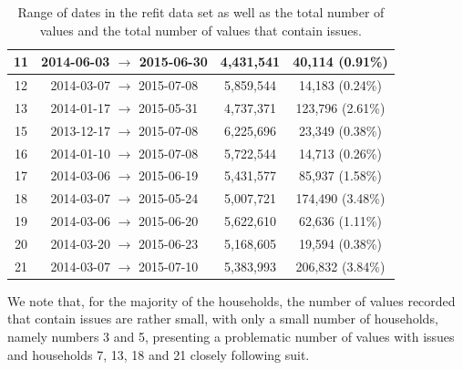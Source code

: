 \begin{table}[H]
\begin{adjustwidth}{-3.0cm}{-3.0cm}
\begin{tabular}{cccc}
                        11                        & 2014-06-03 $\rightarrow$ 2015-06-30 & 4,431,541                       & 40,114 (0.91\%)                    \\ \midrule
                        12                        & 2014-03-07 $\rightarrow$ 2015-07-08 & 5,859,544                       & 14,183 (0.24\%)                    \\ \midrule
                        13                        & 2014-01-17 $\rightarrow$ 2015-05-31 & 4,737,371                       & 123,796 (2.61\%)                   \\ \midrule
                        15                        & 2013-12-17 $\rightarrow$ 2015-07-08 & 6,225,696                       & 23,349 (0.38\%)                    \\ \midrule
                        16                        & 2014-01-10 $\rightarrow$ 2015-07-08 & 5,722,544                       & 14,713 (0.26\%)                    \\ \midrule
                        17                        & 2014-03-06 $\rightarrow$ 2015-06-19 & 5,431,577                       & 85,937 (1.58\%)                    \\ \midrule
                        18                        & 2014-03-07 $\rightarrow$ 2015-05-24 & 5,007,721                       & 174,490 (3.48\%)                   \\ \midrule
                        19                        & 2014-03-06 $\rightarrow$ 2015-06-20 & 5,622,610                       & 62,636 (1.11\%)                    \\ \midrule
                        20                        & 2014-03-20 $\rightarrow$ 2015-06-23 & 5,168,605                       & 19,594 (0.38\%)                    \\ \midrule
                        21                        & 2014-03-07 $\rightarrow$ 2015-07-10 & 5,383,993                       & 206,832 (3.84\%)                   \\ \bottomrule
                \end{tabular}
                \caption{Range of dates in the \gls{refit} data set as well as the total number of values and the total number of values that contain issues.}
                \label{tab:REFIT-values-recorded}
        \end{adjustwidth}
\end{table}

\noindent \newline We note that, for the majority of the households, the number of values recorded that contain issues are rather small, with only a small number of households, namely numbers 3 and 5, presenting a problematic number of values with issues and households 7, 13, 18 and 21 closely following suit.

